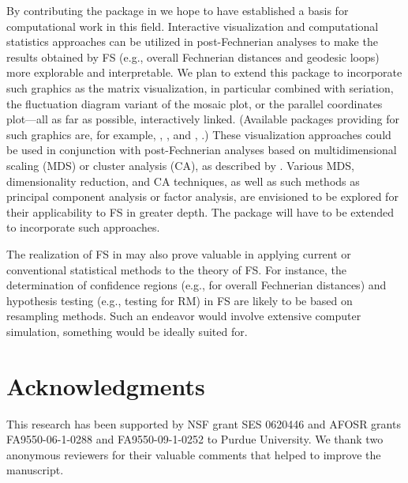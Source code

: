 \documentclass[nojss]{jss}
\begin{document}
By contributing the package  in  we hope to have established a basis for computational work in this field.
Interactive visualization and computational statistics approaches can be utilized in post-Fechnerian analyses to make the results 
obtained by FS (e.g., overall Fechnerian distances and geodesic loops) more explorable and interpretable. 
We plan to extend this package to incorporate such graphics as the matrix visualization, in particular combined with seriation, 
the fluctuation diagram variant of the mosaic plot, or the parallel coordinates plot---all as far as possible, interactively linked. 
(Available  packages providing for such graphics 
are, for example, , \citealp{seriation}, and , \citealp{iplots}.) These visualization approaches could be used in conjunction with post-Fechnerian 
analyses based on multidimensional scaling (MDS) or cluster analysis (CA), as described by \cite{DzhCol2006b}. 
Various MDS, dimensionality reduction, and CA techniques, as well as such methods as principal component analysis or factor analysis, 
are envisioned to be explored for their applicability to FS in greater depth.
The package  will have to be extended to incorporate such approaches.

The realization of FS in  may also prove valuable in applying current or conventional statistical methods 
to the theory of FS. 
For instance, the determination of confidence regions (e.g., for overall Fechnerian distances) and hypothesis testing (e.g., testing for RM) 
in FS are likely to be based on resampling methods. Such an endeavor would involve extensive computer simulation, something 
 would be ideally suited for.

\section*{Acknowledgments}

This research has been supported by NSF grant SES 0620446 and AFOSR grants FA9550-06-1-0288 and FA9550-09-1-0252 to Purdue University.
We thank two anonymous reviewers for their valuable comments that helped to improve the manuscript.



\end{document}
